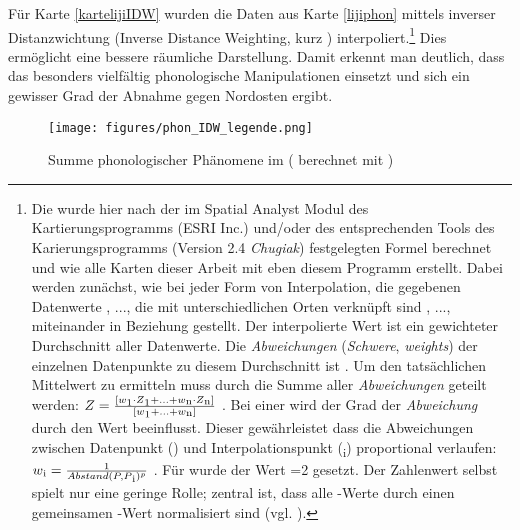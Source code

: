 Für Karte \ref{kartelijiIDW} wurden die Daten aus Karte \ref{lijiphon} mittels inverser Distanzwichtung (Inverse Distance Weighting, kurz ) interpoliert.\footnote{Die  wurde hier nach der im Spatial Analyst Modul des Kartierungsprogramms  (ESRI Inc.) und/oder des entsprechenden Tools des Karierungsprogramms  (Version 2.4 \textit{Chugiak}) festgelegten Formel berechnet und wie alle Karten dieser Arbeit mit eben diesem Programm erstellt. Dabei werden zunächst, wie bei jeder Form von Interpolation, die gegebenen Datenwerte  , ...,   die mit unterschiedlichen Orten verknüpft sind , ...,  miteinander in Beziehung gestellt. Der interpolierte Wert ist ein gewichteter Durchschnitt aller Datenwerte. Die \textit{Abweichungen} (\textit{Schwere}, \textit{weights}) der einzelnen Datenpunkte zu diesem Durchschnitt ist . Um den tatsächlichen Mittelwert zu ermitteln muss durch die Summe aller \textit{Abweichungen} geteilt werden: 
\begin{math} 
Z = \frac{[w\textsubscript{1} \cdot Z\textsubscript{1} + ... + w\textsubscript{n} \cdot Z\textsubscript{n}]}  {[w\textsubscript{1} + ... + w\textsubscript{n}]}
\end{math}
. Bei einer  wird der Grad der \textit{Abweichung} durch den Wert  beeinflusst. Dieser gewährleistet dass die Abweichungen zwischen  Datenpunkt () und Interpolationspunkt (\textsubscript{i}) proportional verlaufen: 
\begin{math} w\textsubscript{i} = \frac{1} {Abstand(P, P\textsubscript{i})^p} \end{math} . Für  wurde der Wert =2 gesetzt. Der Zahlenwert selbst spielt nur eine geringe Rolle; zentral ist, dass alle -Werte durch einen gemeinsamen -Wert normalisiert sind (vgl. \cite[132–160]{BurroughMcDonnell1998}).} Dies ermöglicht eine bessere räumliche Darstellung. Damit erkennt man deutlich, dass das  besonders vielfältig phonologische Manipulationen einsetzt und sich ein gewisser Grad der Abnahme gegen Nordosten ergibt.\\ 
  
 \begin{figure}[h!]
		\centering
\texttt{[image: figures/phon\_IDW\_legende.png]}
		\caption{\label{kartelijiIDWQGIS} Summe phonologischer Phänomene im  ( berechnet mit )}
		\end{figure}
		
